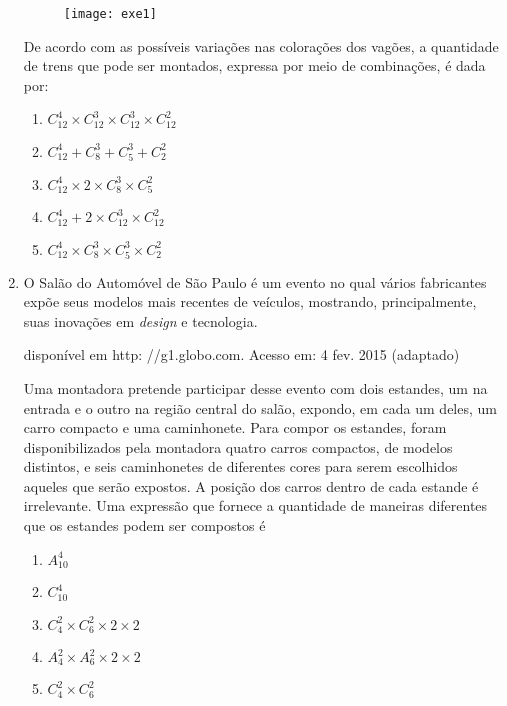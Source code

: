 \begin{enumerate}
\begin{figure}[H]
\centering

\texttt{[image: exe1]}
\end{figure}

De acordo com as possíveis variações nas colorações dos vagões, a quantidade de trens que pode ser montados, expressa por meio de combinações, é dada por: 

\clearpage
\begin{enumerate}
\item $C^4_{12} \times C^3_{12} \times C^3_{12} \times C^2_{12}$
\item $C^4_{12} + C^3_{8} + C^3_{5} + C^2_{2}$
\item $C^4_{12} \times 2 \times C^3_{8} \times C^2_{5}$
\item $C^4_{12} + 2 \times C^3_{12} \times C^2_{12}$
\item $C^4_{12} \times C^3_{8} \times C^3_{5} \times C^2_{2}$
\end{enumerate}


\item O Salão do Automóvel de São Paulo é um evento no qual vários fabricantes expõe seus modelos mais recentes de veículos, mostrando, principalmente, suas inovações em \textit{design} e tecnologia. 
\begin{flushright}
\small{disponível em http: //g1.globo.com. Acesso em: 4 fev. 2015 (adaptado)}
\end{flushright}

Uma montadora pretende participar desse evento com dois estandes, um na entrada e o outro na região central do salão, expondo, em cada um deles, um carro compacto e uma caminhonete.
Para compor os estandes, foram disponibilizados pela montadora quatro carros compactos, de modelos distintos, e seis caminhonetes de diferentes cores para serem escolhidos aqueles que serão expostos. A posição dos carros dentro de cada estande é irrelevante.
Uma expressão que fornece a quantidade de maneiras diferentes que os estandes podem ser compostos é
 
 \begin{enumerate}
\item $A^4_{10}$
\item $C^4_{10}$
\item $C^2_{4} \times  C^2_{6} \times 2 \times 2$
\item $A^2_{4} \times A^2_{6} \times 2 \times 2$
\item $C^2_{4} \times C^2_{6}$
\end{enumerate}


\end{enumerate}
